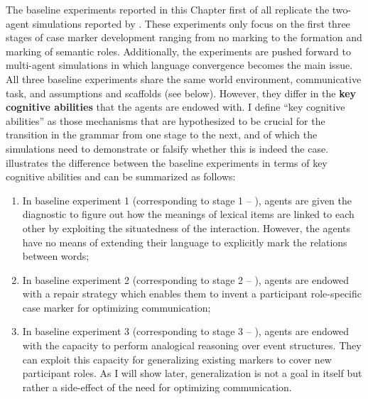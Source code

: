 The baseline experiments reported in this Chapter first of all replicate the two-agent simulations reported by \citet{steels02simulating, steels04constructivist}. These experiments only focus on the first three stages of case marker development ranging from no marking to the formation and marking of semantic roles. Additionally, the experiments are pushed forward to multi-agent simulations in which language convergence becomes the main issue. All three baseline experiments share the same world environment, communicative task, and assumptions and scaffolds (see below). However, they differ in the {\bfseries key cognitive abilities} that the agents are endowed with. I define ``key cognitive abilities'' as those mechanisms that are hypothesized to be crucial for the transition in the grammar from one stage to the next, and of which the simulations need to demonstrate or falsify whether this is indeed the case.  illustrates the difference between the baseline experiments in terms of key cognitive abilities and can be summarized as follows:

\begin{enumerate}
\item In baseline experiment 1 (corresponding to stage 1 -- ), agents are given the diagnostic to figure out how the meanings of lexical items are linked to each other by exploiting the situatedness of the interaction. However, the agents have no means of extending their language to explicitly mark the relations between words;
\item In baseline experiment 2 (corresponding to stage 2 -- ), agents are endowed with a repair strategy which enables them to invent a participant role-specific case marker for optimizing communication;
\item In baseline experiment 3 (corresponding to stage 3 -- ), agents are endowed with the capacity to perform analogical reasoning over event structures. They can exploit this capacity for generalizing existing markers to cover new participant roles. As I will show later, generalization is not a goal in itself but rather a side-effect of the need for optimizing communication.
\end{enumerate}


